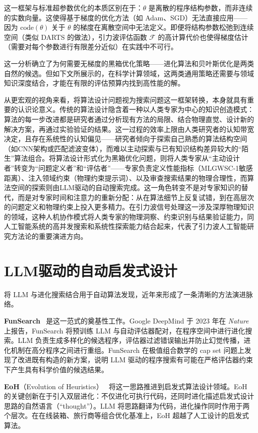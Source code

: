 这一框架与标准超参数优化的本质区别在于：$\theta$ 是离散的程序结构参数，而非连续的实数向量。这使得基于梯度的优化方法（如 Adam、SGD）无法直接应用——因为 $\text{code}(\theta)$ 关于 $\theta$ 的梯度在离散空间中无法定义。即便将结构参数松弛到连续空间（类似 DARTS 的做法），引力波评估函数 $\mathcal{F}$ 的高计算代价也使得梯度估计（需要对每个参数进行有限差分近似）在实践中不可行。

这一分析确立了为何需要无梯度的黑箱优化策略——进化算法和贝叶斯优化是两类自然的候选。但如下文所展示的，在科学计算领域，这两类通用策略还需要与领域知识深度结合，才能在有限的评估预算内找到高性能的解。

从更宏观的视角来看，将算法设计问题视为搜索问题这一框架转换，本身就具有重要的认识论意义。传统的算法设计隐含着一种以人类专家为中心的知识创造模式：算法的每一步改进都是研究者通过分析现有方法的局限、结合物理直觉、设计新的解决方案，再通过实验验证的结果。这一过程的效率上限由人类研究者的认知带宽决定，且存在系统性的认知偏见——研究者倾向于探索自己熟悉的算法结构空间（如CNN架构或匹配滤波变体），而难以主动探索与已有知识结构差异较大的“陌生”算法组合。将算法设计形式化为黑箱优化问题，则将人类专家从“主动设计者”转变为“问题定义者”和“评估者”——专家负责定义性能指标（MLGWSC-1敏感距离）、注入领域约束（物理约束提示词）、以及审查搜索结果的物理合理性，而算法空间的探索则由LLM驱动的自动搜索完成。这一角色转变不是对专家知识的替代，而是对专家时间和注意力的重新分配：从在算法细节上反复试错，到在高层次的问题定义和物理约束上投入更多精力。在引力波信号处理这一涉及深厚物理知识的领域，这种人机协作模式将人类专家的物理洞察、约束识别与结果验证能力，同人工智能系统的高并发搜索和系统性探索能力结合起来，代表了引力波人工智能研究方法论的重要演进方向。

\section{LLM驱动的自动启发式设计}

将 LLM 与进化搜索结合用于自动算法发现，近年来形成了一条清晰的方法演进脉络。

\textbf{FunSearch}~\cite{romera2024funsearch} 是这一范式的奠基性工作。Google DeepMind 于 2023 年在 \textit{Nature} 上报告，FunSearch 将预训练 LLM 与自动评估器配对，在程序空间中进行进化搜索。LLM 负责生成多样化的候选程序，评估器过滤错误输出并防止幻觉传播，进化机制在高分程序之间进行重组。FunSearch 在极值组合数学的 cap set 问题上发现了改进既有构造的新方案，说明 LLM 驱动的程序搜索有可能在严格评估器约束下产生具有科学价值的候选结果。

\textbf{EoH}（Evolution of Heuristics）~\cite{liu2024eoh} 将这一思路推进到启发式算法设计领域。EoH 的关键创新在于引入双层进化：不仅进化可执行代码，还同时进化描述启发式设计思路的自然语言（“thought”）。LLM 将思路翻译为代码，进化操作同时作用于两个层次。在在线装箱、旅行商等组合优化基准上，EoH 超越了人工设计的启发式算法。

